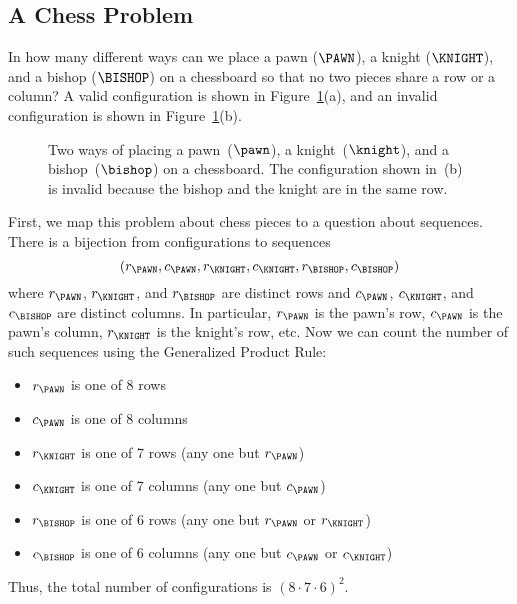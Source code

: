 \subsection{A Chess Problem}

In how many different ways can we place a pawn ($\PAWN$), a knight
($\KNIGHT$), and a bishop ($\BISHOP$) on a chessboard so that no two
pieces share a row or a column?  A valid configuration is shown in
Figure~\ref{fig:11Q7}(a), and an invalid configuration is shown in
Figure~\ref{fig:11Q7}(b).

\begin{figure}\normalbaselines

\subfloat[valid]{\chessboard[setpieces={bb4, ne7, pf2}]}
\subfloat[invalid]{\chessboard[setpieces={bc3, pe6, nf3}]}

\caption{Two ways of placing a pawn~($\pawn$), a knight~($\knight$),
  and a bishop~($\bishop$) on a chessboard.  The configuration shown
  in~(b) is invalid because the bishop and the knight are in the same
  row.}

\label{fig:11Q7}

\end{figure}

First, we map this problem about chess pieces to a question about
sequences.  There is a bijection from configurations to sequences
%
\[
    (r_{\PAWN}, c_{\PAWN}, r_{\KNIGHT}, c_{\KNIGHT}, r_{\BISHOP}, c_{\BISHOP})
\]
%
where $r_{\PAWN}$, $r_{\KNIGHT}$, and $r_{\BISHOP}$ are distinct rows
and $c_{\PAWN}$, $c_{\KNIGHT}$, and $c_{\BISHOP}$ are distinct
columns.  In particular, $r_{\PAWN}$ is the pawn's row, $c_{\PAWN}$ is
the pawn's column, $r_{\KNIGHT}$ is the knight's row, etc.  Now we can
count the number of such sequences using the Generalized Product Rule:
\begin{itemize}\compactlist

\item $r_{\PAWN}$ is one of 8 rows

\item $c_{\PAWN}$ is one of 8 columns

\item $r_{\KNIGHT}$ is one of 7 rows (any one but $r_{\PAWN}$)

\item $c_{\KNIGHT}$ is one of 7 columns (any one but $c_{\PAWN}$)

\item $r_{\BISHOP}$ is one of 6 rows (any one but $r_{\PAWN}$ or
  $r_{\KNIGHT}$)

\item $c_{\BISHOP}$ is one of 6 columns (any one but $c_{\PAWN}$ or
  $c_{\KNIGHT}$)

\end{itemize}
Thus, the total number of configurations is $(8 \cdot 7 \cdot 6)^2$.

